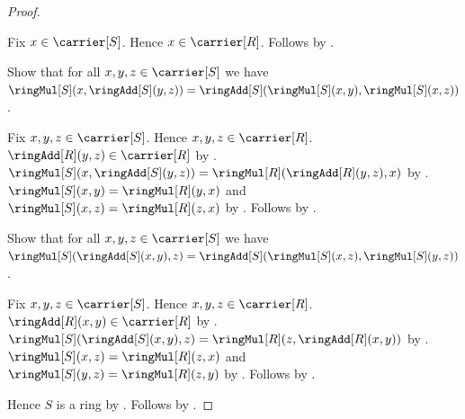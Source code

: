 \begin{proof}
\begin{subproof}
        Fix $x\in\carrier[S]$.
        Hence $x\in\carrier[R]$.
        Follows by
            .
    \end{subproof}
    Show that for all $x,y,z\in\carrier[S]$ we have
        $\ringMul[S](x,\ringAdd[S](y,z))
            =\ringAdd[S](\ringMul[S](x,y),\ringMul[S](x,z))$.
    \begin{subproof}
        Fix $x,y,z\in\carrier[S]$.
        Hence $x,y,z\in\carrier[R]$.
        $\ringAdd[R](y,z)\in\carrier[R]$ by
            .
        $\ringMul[S](x,\ringAdd[S](y,z))
            =\ringMul[R](\ringAdd[R](y,z),x)$ by
            .
        $\ringMul[S](x,y)=\ringMul[R](y,x)$ and
            $\ringMul[S](x,z)=\ringMul[R](z,x)$ by
            .
        Follows by .
    \end{subproof}
    Show that for all $x,y,z\in\carrier[S]$ we have
        $\ringMul[S](\ringAdd[S](x,y),z)
            =\ringAdd[S](\ringMul[S](x,z),\ringMul[S](y,z))$.
    \begin{subproof}
        Fix $x,y,z\in\carrier[S]$.
        Hence $x,y,z\in\carrier[R]$.
        $\ringAdd[R](x,y)\in\carrier[R]$ by
            .
        $\ringMul[S](\ringAdd[S](x,y),z)
            =\ringMul[R](z,\ringAdd[R](x,y))$ by
            .
        $\ringMul[S](x,z)=\ringMul[R](z,x)$ and
            $\ringMul[S](y,z)=\ringMul[R](z,y)$ by
            .
        Follows by .
    \end{subproof}
    Hence $S$ is a ring by
        .
    Follows by .
\end{proof}

